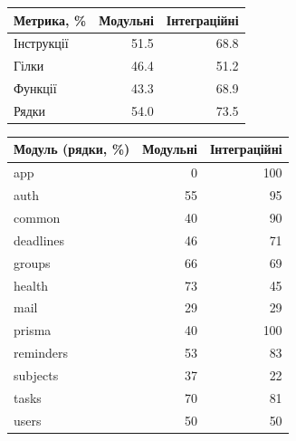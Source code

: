 \begin{tabular}[t]{@{}lrr@{}}
\toprule
Метрика, \% & Модульні & Інтеграційні\\
\midrule
Інструкції & 51.5 & 68.8\\
Гілки & 46.4 & 51.2\\
Функції & 43.3 & 68.9\\
Рядки & 54.0 & 73.5\\
\bottomrule
\end{tabular}

\medskip

\begin{tabular}[t]{@{}lrr@{}}
\toprule
Модуль (рядки, \%) & Модульні & Інтеграційні\\
\midrule
app & 0 & 100\\
auth & 55 & 95\\
common & 40 & 90\\
deadlines & 46 & 71\\
groups & 66 & 69\\
health & 73 & 45\\
mail & 29 & 29\\
prisma & 40 & 100\\
reminders & 53 & 83\\
subjects & 37 & 22\\
tasks & 70 & 81\\
users & 50 & 50\\
\bottomrule
\end{tabular}
